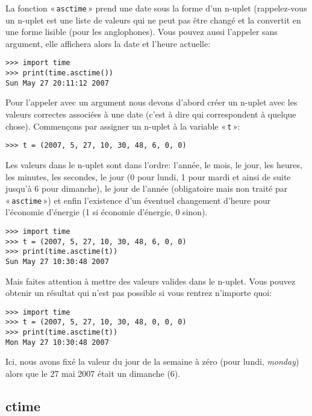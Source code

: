 La fonction « \verb+asctime+ » prend une date sous la forme d'un n-uplet (rappelez-vous un n-uplet est une liste de valeurs qui ne peut pas être changé et la convertit en une forme lisible (pour les anglophones). Vous pouvez aussi l'appeler sans argument, elle affichera alors la date et l'heure actuelle:

\begin{Verbatim}[frame=single,rulecolor=\color{gray}]
>>> import time
>>> print(time.asctime())
Sun May 27 20:11:12 2007
\end{Verbatim}

Pour l'appeler avec un argument nous devons d'abord créer un n-uplet avec les valeurs correctes associées à une date (c'est à dire qui correspondent à quelque chose). Commençons par assigner un n-uplet à la variable « \texttt{t} »:

\begin{Verbatim}[frame=single,rulecolor=\color{gray}]
>>> t = (2007, 5, 27, 10, 30, 48, 6, 0, 0)
\end{Verbatim}

Les valeurs dans le n-uplet sont dans l'ordre: l'année, le mois, le jour, les heures, les minutes, les secondes, le jour (0 pour lundi, 1 pour mardi et ainsi de suite jusqu'à 6 pour dimanche), le jour de l'année (obligatoire mais non traité par « \texttt{asctime} ») et enfin l'existence d'un éventuel changement d'heure pour l'économie d'énergie (1 si économie d'énergie, 0 sinon).

\begin{Verbatim}[frame=single,rulecolor=\color{gray}]
>>> import time
>>> t = (2007, 5, 27, 10, 30, 48, 6, 0, 0)
>>> print(time.asctime(t))
Sun May 27 10:30:48 2007
\end{Verbatim}

Mais faites attention à mettre des valeurs valides dans le n-uplet. Vous pouvez obtenir un résultat qui n'est pas possible si vous rentrez n'importe quoi:

\begin{Verbatim}[frame=single,rulecolor=\color{gray}]
>>> import time
>>> t = (2007, 5, 27, 10, 30, 48, 0, 0, 0)
>>> print(time.asctime(t))
Mon May 27 10:30:48 2007
\end{Verbatim}

Ici, nous avons fixé la valeur du jour de la semaine à zéro (pour lundi, \emph{monday}) alors que le 27 mai 2007 était un dimanche (6).

\subsection{ctime}

